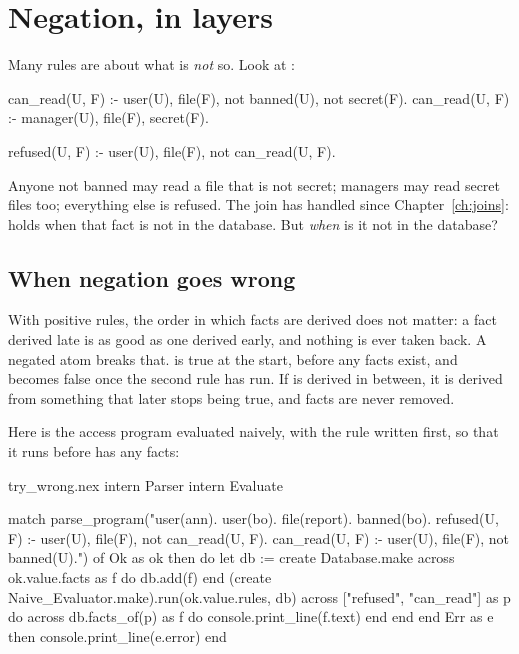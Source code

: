 \chapter{Negation, in layers}\label{ch:negation}

Many rules are about what is \emph{not} so. Look at :

\begin{shell}
can_read(U, F) :- user(U), file(F), not banned(U), not secret(F).
can_read(U, F) :- manager(U), file(F), secret(F).

refused(U, F) :- user(U), file(F), not can_read(U, F).
\end{shell}

Anyone not banned may read a file that is not secret; managers may read
secret files too; everything else is refused. The join has handled
 since Chapter~\ref{ch:joins}:  holds when
that fact is not in the database. But \emph{when} is it not in the
database?

\section{When negation goes wrong}

With positive rules, the order in which facts are derived does not matter:
a fact derived late is as good as one derived early, and nothing is ever
taken back. A negated atom breaks that. 
is true at the start, before any  facts exist, and becomes
false once the second rule has run. If  is derived in
between, it is derived from something that later stops being true, and
facts are never removed.

Here is the access program evaluated naively, with the  rule
written first, so that it runs before  has any facts:

\begin{tryit}{try_wrong.nex}
intern Parser
intern Evaluate

match parse_program("user(ann). user(bo). file(report). banned(bo).
refused(U, F) :- user(U), file(F), not can_read(U, F).
can_read(U, F) :- user(U), file(F), not banned(U).") of
  Ok as ok then
    do
      let db := create Database.make
      across ok.value.facts as f do
        db.add(f)
      end
      (create Naive_Evaluator.make).run(ok.value.rules, db)
      across ["refused", "can_read"] as p do
        across db.facts_of(p) as f do
          console.print_line(f.text)
        end
      end
    end
  Err as e then console.print_line(e.error)
end
\end{tryit}

